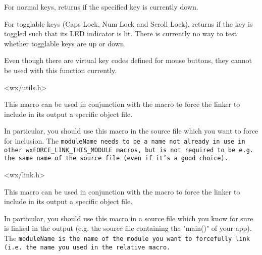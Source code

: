 \label{wxgetkeystate}


For normal keys, returns \true if the specified key is currently down.

For togglable keys (Caps Lock, Num Lock and Scroll Lock), returns
\true if the key is toggled such that its LED indicator is lit. There is
currently no way to test whether togglable keys are up or down.

Even though there are virtual key codes defined for mouse buttons, they
cannot be used with this function currently.


<wx/utils.h>




\label{wxforcelinkthismodule}


This macro can be used in conjunction with the
 macro to force
the linker to include in its output a specific object file.

In particular, you should use this macro in the source file which you want
to force for inclusion. The \tt{moduleName} needs to be a name not already
in use in other \tt{wxFORCE\_LINK\_THIS\_MODULE} macros, but is not required
to be e.g. the same name of the source file (even if it's a good choice).


<wx/link.h>


\label{wxforcelinkmodule}


This macro can be used in conjunction with the
 macro to force
the linker to include in its output a specific object file.

In particular, you should use this macro in a source file which you know
for sure is linked in the output (e.g. the source file containing the "main()"
of your app). The \tt{moduleName} is the name of the module you want to forcefully link
(i.e. the name you used in the relative  macro.


